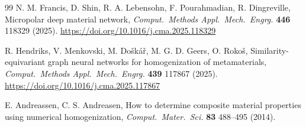 \documentclass[11pt,a4paper]{article}
\begin{document}
\begin{thebibliography}{99}
 N. M. Francis, D. Shin, R. A. Lebensohn, F. Pourahmadian,
R. Dingreville, Micropolar deep material network, \emph{Comput.\ Methods Appl.\ Mech.\
Engrg.} \textbf{446} 118329 (2025). \url{https://doi.org/10.1016/j.cma.2025.118329}

 R. Hendriks, V. Menkovski, M. Do\v{s}k\'a\v{r}, M. G. D. Geers,
O. Roko\v{s}, Similarity-equivariant graph neural networks for homogenization of
metamaterials, \emph{Comput.\ Methods Appl.\ Mech.\ Engrg.} \textbf{439} 117867 (2025).
\url{https://doi.org/10.1016/j.cma.2025.117867}

 E. Andreassen, C. S. Andreasen, How to determine composite material
properties using numerical homogenization, \emph{Comput.\ Mater.\ Sci.} \textbf{83}
488--495 (2014).

\end{thebibliography}
\end{document}
